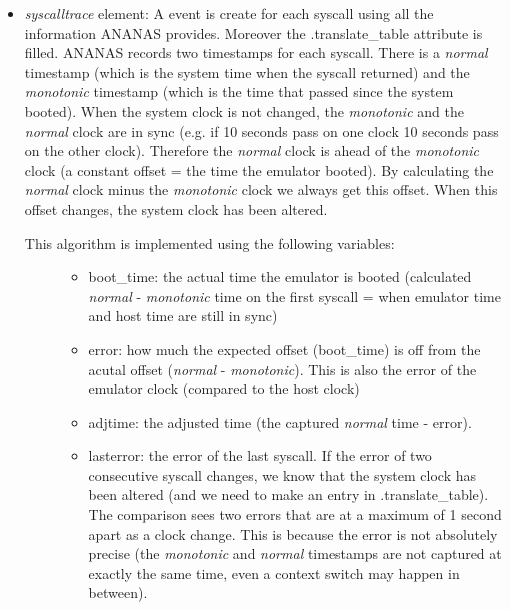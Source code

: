 \documentclass[letterpaper,10pt,english]{sphinxmanual}
\begin{document}
\begin{fulllineitems}
\begin{fulllineitems}
\begin{itemize}
\item {} 
\emph{syscalltrace} element: A {\hyperref[ambrosia_plugins.lkm:ambrosia_plugins.lkm.events.SyscallEvent]{}} event is create for each syscall
using all the information ANANAS provides. Moreover the .translate\_table
attribute is filled. ANANAS records two timestamps for each syscall. There is a \emph{normal} timestamp (which is
the system time when the syscall returned) and the \emph{monotonic} timestamp (which is the time that passed since
the system booted). When the system clock is not changed, the \emph{monotonic} and the \emph{normal} clock are in sync
(e.g. if 10 seconds pass on one clock 10 seconds pass on the other clock). Therefore the \emph{normal} clock is
ahead of the \emph{monotonic} clock (a constant offset = the time the emulator booted). By calculating the
\emph{normal} clock minus the \emph{monotonic} clock we always get this offset. When this offset changes, the system
clock has been altered.
\begin{description}
\item[{This algorithm is implemented using the following variables:}] \leavevmode\begin{itemize}
\item {} 
boot\_time: the actual time the emulator is booted (calculated \emph{normal} - \emph{monotonic} time on the first
syscall = when emulator time and host time are still in sync)

\item {} 
error: how much the expected offset (boot\_time) is off from the acutal offset (\emph{normal} - \emph{monotonic}).
This is also the error of the emulator clock (compared to the host clock)

\item {} 
adjtime: the adjusted time (the captured \emph{normal} time - error).

\item {} 
lasterror: the error of the last syscall. If the error of two consecutive syscall changes, we know that
the system clock has been altered (and we need to make an entry in
.translate\_table). The comparison sees two errors that are at a maximum
of 1 second apart as a clock change. This is because the error is not absolutely precise (the \emph{monotonic}
and \emph{normal} timestamps are not captured at exactly the same time, even a context switch may happen in
between).

\end{itemize}

\end{description}

\end{itemize}

\end{fulllineitems}


\end{fulllineitems}
\end{document}
